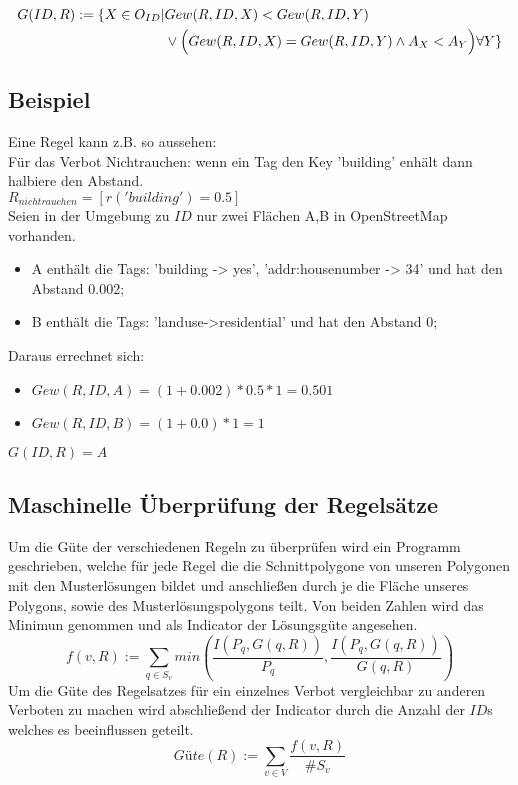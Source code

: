 \begin{align}
G(ID,R) := \{X \in O_{ID} | & Gew(R,ID,X) < Gew(R,ID,Y)\\
& \lor \Big(Gew(R,ID,X)=Gew(R,ID,Y) \land A_X < A_Y\Big) \forall Y\} \notag
\end{align}

\subsection{Beispiel}
Eine Regel kann z.B. so aussehen:\\
Für das Verbot Nichtrauchen: wenn ein Tag den Key 'building' enhält dann halbiere den Abstand. \\
$R_{nichtrauchen} = [r('building') = 0.5]$\\
\newline
Seien in der Umgebung zu $ID$ nur zwei Flächen A,B in OpenStreetMap vorhanden.
\begin{itemize}
\item A enthält die Tags: 'building -> yes', 'addr:housenumber -> 34' und hat den Abstand 0.002;
\item B enthält die Tags: 'landuse->residential' und hat den Abstand 0;
\end{itemize}
Daraus errechnet sich:
\begin{itemize}
\item $Gew(R,ID,A) = (1+0.002) * 0.5 * 1 = 0.501$
\item $Gew(R,ID,B) = (1+0.0) * 1 = 1$
\end{itemize}

$G(ID,R) = A$

\subsection{Maschinelle Überprüfung der Regelsätze}
Um die Güte der verschiedenen Regeln zu überprüfen wird ein Programm geschrieben, welche für jede Regel die die Schnittpolygone von unseren Polygonen mit
den Musterlösungen bildet und anschließen durch je die Fläche unseres Polygons, sowie des Musterlösungspolygons teilt.
Von beiden Zahlen wird das Minimun genommen und als Indicator der Lösungsgüte angesehen.\\
\begin{equation}
f(v,R) := \sum_{q\in S_v} min(\frac{I(P_q,G(q,R))}{P_q},\frac{I(P_q,G(q,R))}{G(q,R)})
\end{equation}
Um die Güte des Regelsatzes für ein einzelnes Verbot vergleichbar zu anderen Verboten zu machen wird abschließend der Indicator durch
die Anzahl der $ID$s welches es beeinflussen geteilt.\\
\begin{equation}
\label{eq:guete}
Güte(R) := \sum_{v \in V} \frac{ f(v,R)}{\#S_v}
\end{equation}

